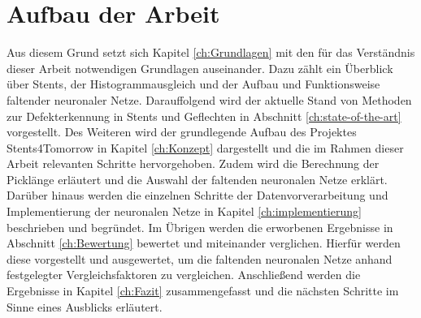 \section{Aufbau der Arbeit}
Aus diesem Grund setzt sich Kapitel \ref{ch:Grundlagen} mit den für das Verständnis dieser Arbeit notwendigen Grundlagen auseinander. Dazu zählt ein Überblick über Stents, der Histogrammausgleich und der Aufbau und Funktionsweise faltender neuronaler Netze. Darauffolgend wird der aktuelle Stand von Methoden zur Defekterkennung in Stents und Geflechten in Abschnitt \ref{ch:state-of-the-art} vorgestellt. Des Weiteren wird der grundlegende Aufbau des Projektes Stents4Tomorrow \cite{flechtmaschine} in Kapitel \ref{ch:Konzept} dargestellt und die im Rahmen dieser Arbeit relevanten Schritte hervorgehoben. Zudem wird die Berechnung der Picklänge erläutert und die Auswahl der faltenden neuronalen Netze erklärt. Darüber hinaus werden die einzelnen Schritte der Datenvorverarbeitung und Implementierung der neuronalen Netze in Kapitel \ref{ch:implementierung} beschrieben und begründet. Im Übrigen werden die erworbenen Ergebnisse in Abschnitt \ref{ch:Bewertung} bewertet und miteinander verglichen. Hierfür werden diese vorgestellt und ausgewertet, um die faltenden neuronalen Netze anhand festgelegter Vergleichsfaktoren zu vergleichen. Anschließend werden die Ergebnisse in Kapitel \ref{ch:Fazit} zusammengefasst und die nächsten Schritte im Sinne eines Ausblicks erläutert.



